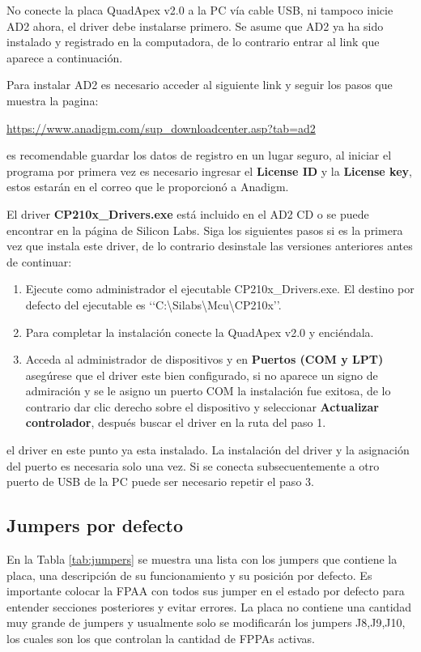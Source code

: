 	No conecte la placa QuadApex v2.0 a la PC vía cable USB,  ni tampoco inicie AD2 ahora, el driver debe instalarse primero. Se asume que AD2 ya ha sido instalado y registrado en la computadora, de lo contrario entrar al link que aparece a continuación.

	Para instalar AD2 es necesario acceder al siguiente link y seguir los pasos que muestra la pagina:

	\begin{center}
		\url{https://www.anadigm.com/sup_downloadcenter.asp?tab=ad2}
	\end{center}
	es recomendable guardar los datos de registro en un lugar seguro, al iniciar el programa por primera vez es necesario ingresar el \textbf{License ID} y la \textbf{License key}, estos estarán en el correo que le proporcionó a Anadigm. 

	El driver \textbf{CP210x\_{}Drivers.exe} está incluido en el AD2 CD o se puede encontrar en la página de Silicon Labs. Siga los siguientes pasos si es la primera vez que instala este driver, de lo contrario desinstale las versiones anteriores antes de continuar:

	\begin{enumerate}
		\item Ejecute como administrador el ejecutable  CP210x\_{}Drivers.exe. El destino por defecto del ejecutable es ‘‘C:\textbackslash{}Silabs\textbackslash{}Mcu\textbackslash{}CP210x’’.
		\item Para completar la instalación conecte la QuadApex v2.0 y enciéndala.
		\item Acceda al administrador de dispositivos y en \textbf{Puertos (COM y LPT)} asegúrese que el driver este bien configurado, si no aparece un signo de admiración y se le asigno un puerto COM  la instalación fue exitosa, de lo contrario dar clic derecho sobre el dispositivo y seleccionar \textbf{Actualizar controlador}, después buscar el  driver en la ruta del paso 1.
	\end{enumerate}
	el driver en este punto ya esta instalado. La instalación del driver y la asignación del puerto es necesaria solo una vez. Si se conecta subsecuentemente a otro puerto de USB de la PC puede ser necesario repetir el paso 3.

	
		\subsection{Jumpers por defecto}
	
	En la Tabla \ref{tab:jumpers} se muestra una lista con los jumpers que contiene la placa, una descripción de su funcionamiento y su posición por defecto. Es importante colocar la FPAA con todos sus jumper en el estado por defecto para entender secciones posteriores y evitar errores. La placa no contiene una cantidad muy grande de jumpers y usualmente solo se modificarán los jumpers J8,J9,J10, los cuales son los que controlan la cantidad de FPPAs activas.
	
